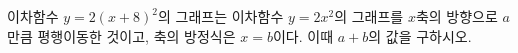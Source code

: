 이차함수 $y=2(x+8)^2$의 그래프는 이차함수 $y=2x^2$의 그래프를 $x$축의 방향으로 $a$만큼 평행이동한 것이고, 축의 방정식은 $x=b$이다. 이때 $a+b$의 값을 구하시오.

